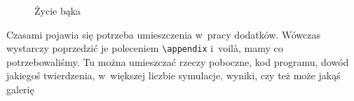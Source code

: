 \begin{figure}[tp]
  \caption{Życie bąka}
  \label{fig:top_life}
\end{figure}

{\red
  Czasami pojawia się potrzeba umieszczenia w~pracy dodatków. Wówczas
  wystarczy poprzedzić je poleceniem \texttt{\textbackslash appendix}
  i~voilà, mamy co potrzebowaliśmy. Tu można umieszczać rzeczy
  poboczne, kod programu, dowód jakiegoś twierdzenia, w~większej
  liczbie symulacje, wyniki, czy też może jakąś galerię \smiley}
